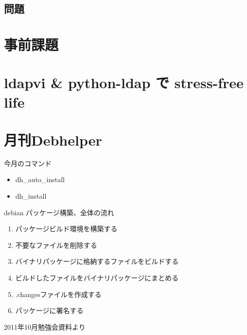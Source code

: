 \subsection{問題}


\section{事前課題}
{\footnotesize
 
}

\section{ldapvi & python-ldap で stress-free life}


\section{月刊Debhelper}

\begin{frame}{今月のコマンド}
\Large
\begin{itemize}
\item dh\_auto\_install
\item dh\_install
\end{itemize}
\end{frame}

\begin{frame}{debian パッケージ構築、全体の流れ}
\begin{enumerate}
\item パッケージビルド環境を構築する
\item 不要なファイルを削除する
\item バイナリパッケージに格納するファイルをビルドする
\item ビルドしたファイルをバイナリパッケージにまとめる
\item .changesファイルを作成する
\item パッケージに署名する
\end{enumerate}
2011年10月勉強会資料より
\end{frame}


